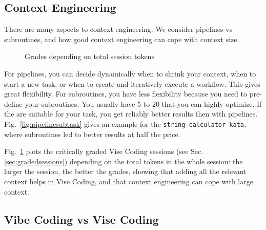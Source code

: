 \documentclass[twocolumn]{article}
\begin{document}
\subsection{Context Engineering}

There are many aspects to context engineering. We consider pipelines vs subroutines, and how good context engineering can cope with context size.

\begin{figure}[hbt!]
  \begin{center}
  \vspace{-1mm}
  \vspace{-5mm}
\caption{Grades depending on total session tokens}
\label{fig:evaltool}
\end{center}
\end{figure}

For pipelines, you can decide dynamically when to shrink your context, when to start a new task, or when to create and iteratively execute a workflow.
This gives great flexibility. For subroutines, you have less flexibility because you need to pre-define your subroutines. You usually have 5 to 20 that you can highly optimize. If the are suitable for your task, you get reliably better results then with pipelines. 
Fig.~\ref{fig:pipelinesubtask} gives an example for the \lstinline|string-calculator-kata|, where subroutines led to better results at half the price.

Fig.~\ref{fig:evaltool} plots the critically graded Vise Coding sessions (see Sec.\ref{sec:gradedsessions}) depending on the total tokens in the whole session:
the larger the session, the better the grades, showing that adding all the relevant context helps in Vise Coding, and that context engineering can cope with large context.


\subsection{Vibe Coding vs Vise Coding}
\end{document}
